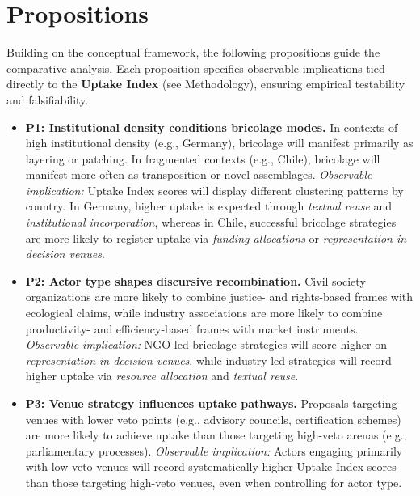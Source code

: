 \section*{Propositions}

Building on the conceptual framework, the following propositions guide the comparative 
analysis. Each proposition specifies observable implications tied directly to the 
\textbf{Uptake Index} (see Methodology), ensuring empirical testability and falsifiability.

\begin{itemize}
    \item \textbf{P1: Institutional density conditions bricolage modes.}  
    In contexts of high institutional density (e.g., Germany), bricolage will manifest 
    primarily as layering or patching. In fragmented contexts (e.g., Chile), bricolage 
    will manifest more often as transposition or novel assemblages.  
    \textit{Observable implication:} Uptake Index scores will display different clustering 
    patterns by country. In Germany, higher uptake is expected through 
    \emph{textual reuse} and \emph{institutional incorporation}, whereas in Chile, 
    successful bricolage strategies are more likely to register uptake via 
    \emph{funding allocations} or \emph{representation in decision venues}.

    \item \textbf{P2: Actor type shapes discursive recombination.}  
    Civil society organizations are more likely to combine justice- and rights-based 
    frames with ecological claims, while industry associations are more likely to combine 
    productivity- and efficiency-based frames with market instruments.  
    \textit{Observable implication:} NGO-led bricolage strategies will score higher on 
    \emph{representation in decision venues}, while industry-led strategies will record 
    higher uptake via \emph{resource allocation} and \emph{textual reuse}.

    \item \textbf{P3: Venue strategy influences uptake pathways.}  
    Proposals targeting venues with lower veto points (e.g., advisory councils, 
    certification schemes) are more likely to achieve uptake than those targeting 
    high-veto arenas (e.g., parliamentary processes).  
    \textit{Observable implication:} Actors engaging primarily with low-veto venues 
    will record systematically higher Uptake Index scores than those targeting 
    high-veto venues, even when controlling for actor type.
\end{itemize}


